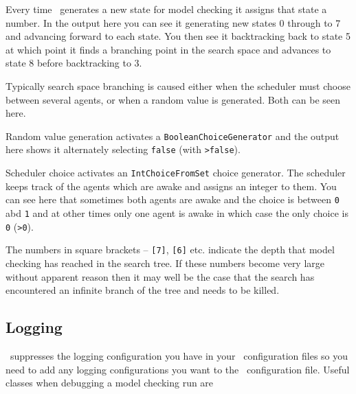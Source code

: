 \documentclass[a4]{article}
\begin{document}
Every time \jpf\ generates a new state for model checking it assigns that state a number.  In the output here you can see it generating new states 0 through to 7 and advancing forward to each state.  You then see it backtracking back to state 5 at which point it finds a branching point in the search space and advances to state 8 before backtracking to 3.

Typically search space branching is caused either when the scheduler must choose between several agents, or when a random value is generated.  Both can be seen here.

Random value generation activates a \texttt{BooleanChoiceGenerator} and the output here shows it alternately selecting  \texttt{false} (with \texttt{>false}).

Scheduler choice activates an \texttt{IntChoiceFromSet} choice generator.  The scheduler keeps track of the agents which are awake and assigns an integer to them.  You can see here that sometimes both agents are awake and the choice is between \texttt{0} abd \texttt{1} and at other times only one agent is awake in which case the only choice is \texttt{0} (\texttt{>0}).

The numbers in square brackets -- \texttt{[7]}, \texttt{[6]} etc. indicate the depth that model checking has reached in the search tree.  If these numbers become very large without apparent reason then it may well be the case that the search has encountered an infinite branch of the tree and needs to be killed.

\subsection{Logging}
\jpf\ suppresses the logging configuration you have in your \ail\ configuration files so you need to add any logging configurations you want to the \jpf\ configuration file.  Useful classes when debugging a model checking run are
\end{document}
